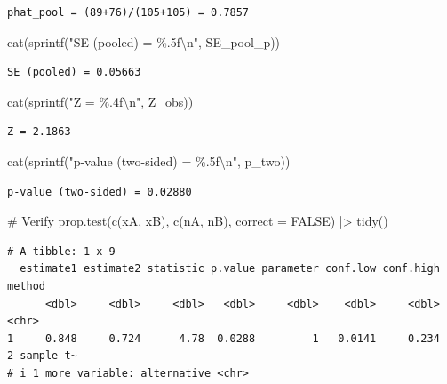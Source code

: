 \documentclass[
  letterpaper,
  DIV=11,
  numbers=noendperiod]{scrartcl}
\newenvironment{Shaded}{\begin{snugshade}}{\end{snugshade}}
\newcommand{\AttributeTok}[1]{\textcolor[rgb]{0.40,0.45,0.13}{#1}}
\newcommand{\CommentTok}[1]{\textcolor[rgb]{0.37,0.37,0.37}{#1}}
\newcommand{\ConstantTok}[1]{\textcolor[rgb]{0.56,0.35,0.01}{#1}}
\newcommand{\FunctionTok}[1]{\textcolor[rgb]{0.28,0.35,0.67}{#1}}
\newcommand{\NormalTok}[1]{\textcolor[rgb]{0.00,0.23,0.31}{#1}}
\newcommand{\SpecialCharTok}[1]{\textcolor[rgb]{0.37,0.37,0.37}{#1}}
\newcommand{\StringTok}[1]{\textcolor[rgb]{0.13,0.47,0.30}{#1}}
\begin{document}
\begin{verbatim}
phat_pool = (89+76)/(105+105) = 0.7857
\end{verbatim}

\begin{Shaded}
\begin{Highlighting}[]
\FunctionTok{cat}\NormalTok{(}\FunctionTok{sprintf}\NormalTok{(}\StringTok{"SE (pooled) = \%.5f}\SpecialCharTok{\textbackslash{}n}\StringTok{"}\NormalTok{, SE\_pool\_p))}
\end{Highlighting}
\end{Shaded}

\begin{verbatim}
SE (pooled) = 0.05663
\end{verbatim}

\begin{Shaded}
\begin{Highlighting}[]
\FunctionTok{cat}\NormalTok{(}\FunctionTok{sprintf}\NormalTok{(}\StringTok{"Z = \%.4f}\SpecialCharTok{\textbackslash{}n}\StringTok{"}\NormalTok{, Z\_obs))}
\end{Highlighting}
\end{Shaded}

\begin{verbatim}
Z = 2.1863
\end{verbatim}

\begin{Shaded}
\begin{Highlighting}[]
\FunctionTok{cat}\NormalTok{(}\FunctionTok{sprintf}\NormalTok{(}\StringTok{"p{-}value (two{-}sided) = \%.5f}\SpecialCharTok{\textbackslash{}n}\StringTok{"}\NormalTok{, p\_two))}
\end{Highlighting}
\end{Shaded}

\begin{verbatim}
p-value (two-sided) = 0.02880
\end{verbatim}

\begin{Shaded}
\begin{Highlighting}[]
\CommentTok{\# Verify}
\FunctionTok{prop.test}\NormalTok{(}\FunctionTok{c}\NormalTok{(xA, xB), }\FunctionTok{c}\NormalTok{(nA, nB), }\AttributeTok{correct =} \ConstantTok{FALSE}\NormalTok{) }\SpecialCharTok{|\textgreater{}} \FunctionTok{tidy}\NormalTok{()}
\end{Highlighting}
\end{Shaded}

\begin{verbatim}
# A tibble: 1 x 9
  estimate1 estimate2 statistic p.value parameter conf.low conf.high method     
      <dbl>     <dbl>     <dbl>   <dbl>     <dbl>    <dbl>     <dbl> <chr>      
1     0.848     0.724      4.78  0.0288         1   0.0141     0.234 2-sample t~
# i 1 more variable: alternative <chr>
\end{verbatim}
\end{document}
